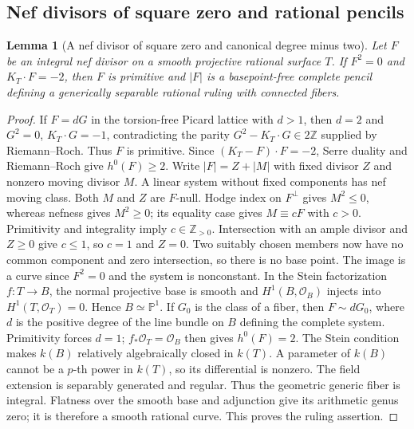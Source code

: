 \documentclass[11pt,reqno]{amsart}
\newtheorem{lemma}[lemma]{Lemma}
\theoremstyle{definition}
\theoremstyle{remark}
\newcommand{\PP}{\mathbb P}
\newcommand{\ZZ}{\mathbb Z}
\numberwithin{equation}{section}
\begin{document}
\subsection{Nef divisors of square zero and rational pencils}
\begin{lemma}[A nef divisor of square zero and canonical degree minus two]
\label{lem:primitive-square-zero}
Let $F$ be an integral nef divisor on a smooth projective rational
surface $T$. If $F^2=0$ and $K_T\cdot F=-2$, then $F$ is primitive
and $|F|$ is a basepoint-free complete pencil defining a generically
separable rational ruling with connected fibers.
\end{lemma}

\begin{proof}
If $F=dG$ in the torsion-free Picard lattice with $d>1$, then $d=2$
and $G^2=0$, $K_T\cdot G=-1$, contradicting the parity
$G^2-K_T\cdot G\in2\ZZ$ supplied by Riemann--Roch.
Thus $F$ is primitive. Since $(K_T-F)\cdot F=-2$,
Serre duality and Riemann--Roch give $h^0(F)\ge2$.
Write $|F|=Z+|M|$ with fixed divisor $Z$ and nonzero moving divisor
$M$. A linear system without fixed components has nef moving class.
Both $M$ and $Z$ are $F$-null. Hodge index on $F^\perp$ gives
$M^2\le0$, whereas nefness gives $M^2\ge0$; its equality case gives
$M\equiv cF$ with $c>0$. Primitivity and integrality imply
$c\in\ZZ_{>0}$. Intersection with an ample divisor and $Z\ge0$
give $c\le1$, so $c=1$ and $Z=0$.
Two suitably chosen members now have no common component and zero
intersection, so there is no base point. The image is a curve since
$F^2=0$ and the system is nonconstant.
In the Stein factorization $f:T\to B$, the normal projective base is
smooth and $H^1(B,\mathcal O_B)$ injects into $H^1(T,\mathcal O_T)=0$.
Hence $B\simeq\PP^1$. If $G_0$ is the class of a fiber, then
$F\sim dG_0$, where $d$ is the positive degree of the line bundle on
$B$ defining the complete system. Primitivity forces $d=1$;
$f_*\mathcal O_T=\mathcal O_B$ then gives $h^0(F)=2$.
The Stein condition makes $k(B)$ relatively algebraically closed in
$k(T)$. A parameter of $k(B)$ cannot be a $p$-th power in $k(T)$,
so its differential is nonzero. The field extension is separably
generated and regular. Thus the geometric generic fiber is integral.
Flatness over the smooth base and adjunction give its arithmetic genus
zero; it is therefore a smooth rational curve. This proves the ruling
assertion.
\end{proof}
\end{document}
